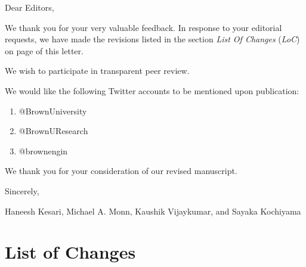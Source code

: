\documentclass[11pt,letterpaper]{report}
\newcommand{\loc}{\textit{LoC}}
\begin{document}
\vspace{4em}
Dear Editors,

We thank you for your very valuable feedback. In response to your editorial requests, we have made the revisions listed in the section \textit{List Of Changes} (\loc) on page \pageref{EditorialChange} of this letter.

We wish to participate in transparent peer review.

We would like the following Twitter accounts to be mentioned upon publication:
\begin{enumerate}
\item @BrownUniversity
\item @BrownUResearch
\item @brownengin
\end{enumerate}

We thank you for your consideration of our revised manuscript.

\vspace{2em}
Sincerely,

Haneesh Kesari, Michael A. Monn, Kaushik Vijaykumar, and Sayaka Kochiyama




\newpage

\section*{List of Changes}
\label{EditorialChange}
\end{document}
